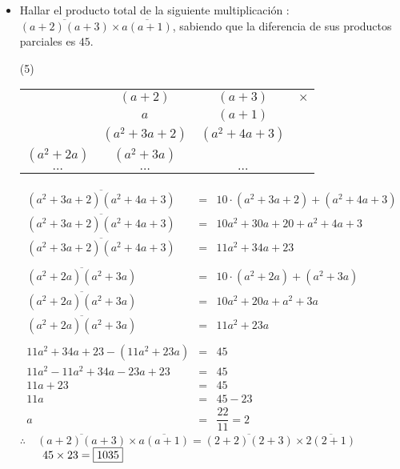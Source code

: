 \documentclass[12pt, twocolumn, landscape, a4paper]{article}
\begin{document}

\begin{itemize}
	\item{Hallar el producto total de la siguiente multiplicación : $\overline{(a  + 2)(a + 3)} \times \overline{a (a + 1)}$, sabiendo que la diferencia de sus productos parciales es $45$.
		\begin{tasks}(5)
		\end{tasks}

	\begin{center}
		\begin{tabular}{cccl}
		\empty & $(a + 2)$ & $(a + 3)$ & $\times$ \\
		\empty & $a$ & $(a + 1)$ & \empty \\
		\hline
		\empty & $(a^2 + 3a + 2)$ & $(a^2 + 4a + 3)$ & \empty \\
		$(a^2 + 2a)$ & $(a^2 + 3a)$ & \empty & \empty \\
		\hline
		$\ldots$ & $\ldots$  & $\ldots$ & \empty
		\end{tabular}
	\end{center}
	
		\begin{eqnarray*}
			\overline{(a^2 + 3a + 2)(a^2 + 4a + 3)} &=& 10 \cdot (a^2 + 3a + 2) + (a^2 + 4a + 3)\\
			\overline{(a^2 + 3a + 2)(a^2 + 4a + 3)} &=& 10a^2 + 30a + 20 + a^2 + 4a + 3\\
			\overline{(a^2 + 3a + 2)(a^2 + 4a + 3)} &=& 11a^2 + 34a + 23 \\
			\\
			\overline{(a^2 + 2a)(a^2 + 3a)} &=& 10 \cdot (a^2 + 2a) + (a^2 + 3a) \\
			\overline{(a^2 + 2a)(a^2 + 3a)} &=& 10a^2 + 20a + a^2 + 3a \\
			\overline{(a^2 + 2a)(a^2 + 3a)} &=& 11a^2 + 23a \\
			\\
			11a^2 + 34a + 23 - (11a^2 + 23a) &=& 45 \\
			11a^2 - 11a^2 + 34a - 23a  + 23 &=& 45 \\
			11a + 23 &=& 45 \\
			11a &=& 45 - 23 \\ %
			a &=& \dfrac{22}{11} = 2
		\end{eqnarray*}
		$\therefore \quad\overline{(a + 2)(a + 3)} \times \overline{a (a + 1)} = \overline{(2 + 2)(2 + 3)} \times \overline{2 (2 + 1)}$ \\ \indent$\qquad45 \times 23 = \fbox{1035}$
	}
	
	
\end{itemize}
\end{document}
